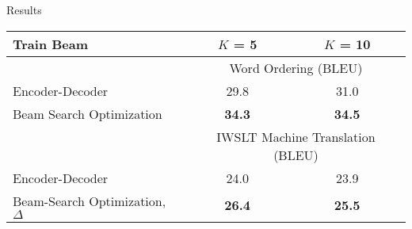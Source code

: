 \begin{frame}{Results}
  \vspace{-0.2cm}
  \begin{table}
  \centering
    \footnotesize
  \begin{tabular}{lcc}
    \toprule
    Train Beam & $K$ = 5 & $K$ = 10 \\
    \midrule
     & \multicolumn{2}{c}{Word Ordering (BLEU) } \\
    \midrule
    Encoder-Decoder & 29.8 & 31.0 \\
    Beam Search Optimization &  \textbf{34.3} & \textbf{34.5} \\
    \midrule




    \midrule

    & \multicolumn{2}{c}{IWSLT Machine Translation (BLEU) } \\
    \midrule
    Encoder-Decoder & 24.0 & 23.9 \\
    Beam-Search Optimization, $\Delta$  &  \textbf{26.4} & \textbf{25.5} \\
    \bottomrule
  \end{tabular}
  \label{tab:mtfinal}
\end{table}

\end{frame}


